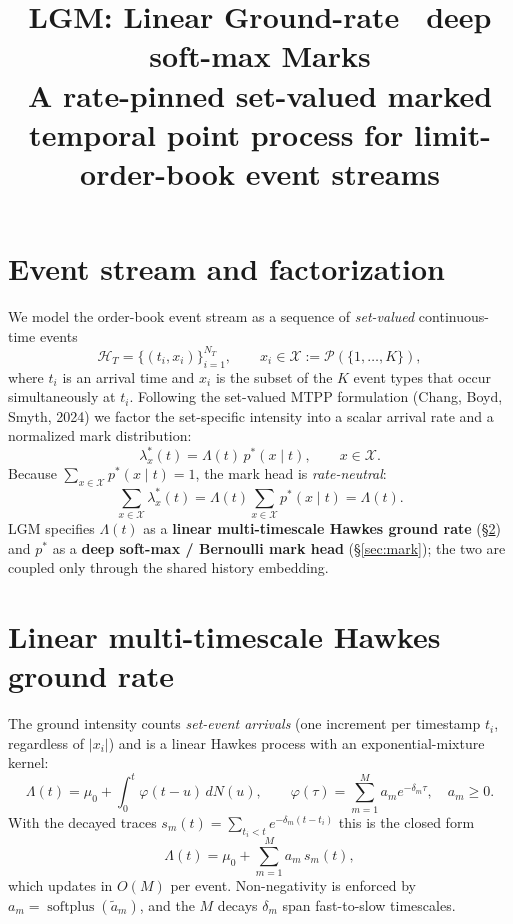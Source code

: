 \documentclass[11pt]{article}
\title{\textbf{LGM: Linear Ground-rate \texttimes\ deep soft-max Marks}\\[2pt]
\large A rate-pinned set-valued marked temporal point process for limit-order-book event streams}
\author{}
\date{}
\newcommand{\Lam}{\Lambda}
\newcommand{\X}{\mathcal{X}}
\newcommand{\Hist}{\mathcal{H}}
\newcommand{\softplus}{\operatorname{softplus}}
\begin{document}
\maketitle
\vspace{-3em}

\section{Event stream and factorization}
We model the order-book event stream as a sequence of \emph{set-valued} continuous-time events
\[
\Hist_T=\{(t_i,x_i)\}_{i=1}^{N_T},\qquad
x_i\in\X:=\mathcal{P}(\{1,\dots,K\}),
\]
where $t_i$ is an arrival time and $x_i$ is the subset of the $K$ event types that occur
simultaneously at $t_i$. Following the set-valued MTPP formulation
(Chang, Boyd, Smyth, 2024) we factor the set-specific intensity into a scalar
arrival rate and a normalized mark distribution:
\[
\boxed{\;\lambda_x^*(t)=\Lam(t)\,p^*(x\mid t),\qquad x\in\X.\;}
\]
Because $\sum_{x\in\X}p^*(x\mid t)=1$, the mark head is \emph{rate-neutral}:
\[
\sum_{x\in\X}\lambda_x^*(t)=\Lam(t)\sum_{x\in\X}p^*(x\mid t)=\Lam(t).
\]
LGM specifies $\Lam(t)$ as a \textbf{linear multi-timescale Hawkes ground rate} (\S\ref{sec:ground})
and $p^*$ as a \textbf{deep soft-max / Bernoulli mark head} (\S\ref{sec:mark}); the two are coupled
only through the shared history embedding.

\section{Linear multi-timescale Hawkes ground rate}\label{sec:ground}
The ground intensity counts \emph{set-event arrivals} (one increment per timestamp $t_i$,
regardless of $|x_i|$) and is a linear Hawkes process with an exponential-mixture kernel:
\[
\Lam(t)=\mu_0+\int_0^t\varphi(t-u)\,dN(u),\qquad
\varphi(\tau)=\sum_{m=1}^{M}a_m e^{-\delta_m\tau},\quad a_m\ge 0.
\]
With the decayed traces $s_m(t)=\sum_{t_i<t}e^{-\delta_m(t-t_i)}$ this is the closed form
\[
\Lam(t)=\mu_0+\sum_{m=1}^{M}a_m\,s_m(t),
\]
which updates in $O(M)$ per event. Non-negativity is enforced by
$a_m=\softplus(\tilde a_m)$, and the $M$ decays $\delta_m$ span fast-to-slow timescales.
\end{document}
